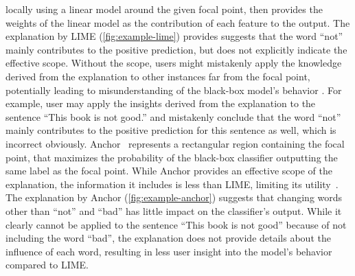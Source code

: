 \documentclass[11pt]{article}
\begin{document}
locally using a linear model around the given focal point,
then provides the weights of the linear model as the contribution of each feature
to the output.
The explanation by LIME (\cref{fig:example-lime}) provides suggests that
the word ``not'' mainly contributes to the positive prediction,
but does not explicitly indicate the effective scope.
Without the scope,
users might mistakenly apply the knowledge derived from the explanation
to other instances far from the focal point,
potentially leading to misunderstanding of the black-box model's behavior
\cite{ribeiro2018anchors}.
For example,
user may apply the insights derived from the explanation
to the sentence ``This book is not good.''
and mistakenly conclude that the word ``not''
mainly contributes to the positive prediction for this sentence as well,
which is incorrect obviously.
Anchor~\cite{ribeiro2018anchors} represents a rectangular region
containing the focal point,
that maximizes the probability of the black-box classifier outputting
the same label as the focal point.
While Anchor provides an effective scope of the explanation,
the information it includes is less than LIME,
limiting its utility~\cite{ribeiro2018anchors}.
The explanation by Anchor (\cref{fig:example-anchor})
suggests that changing words other than ``not'' and ``bad''
has little impact on the classifier's output.
While it clearly cannot be applied to the sentence ``This book is not good''
because of not including the word ``bad'',
the explanation does not provide details about the influence of each word,
resulting in less user insight into the model's behavior compared to LIME.

% 
\end{document}
